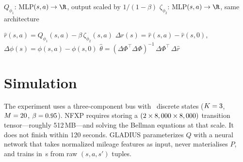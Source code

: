\documentclass[10pt]{article}
\begin{document}
\begin{algorithm}[H]
\DontPrintSemicolon
\caption{GLADIUS (ERM-IRL) \citep{kang2025}}
\label{alg:gladius}
\BlankLine

$Q_{\phi_1}$: MLP$(s, a) \to \R$, output scaled by $1/(1-\beta)$\;
$\zeta_{\phi_2}$: MLP$(s, a) \to \R$, same architecture\;
\BlankLine

\BlankLine

$\hat r(s,a) = Q_{\phi_1}(s,a) - \beta\,\zeta_{\phi_2}(s,a)$\;
$\Delta r(s) = \hat r(s,a) - \hat r(s,0)$, \quad $\Delta\phi(s) = \phi(s,a) - \phi(s,0)$\;
$\hat\theta = (\Delta\Phi^\top\Delta\Phi)^{-1}\,\Delta\Phi^\top\,\Delta \hat r$ 
\BlankLine

\end{algorithm}


\section{Simulation}



The experiment uses a three-component bus with \gladNstates\ discrete states ($K=3$, $M=20$, $\beta = 0.95$). NFXP requires storing a $(2 \times 8,000 \times 8,000)$ transition tensor---roughly 512\,MB---and solving the Bellman equations at that scale. It does not finish within 120 seconds. GLADIUS parameterizes $Q$ with a neural network that takes normalized mileage features as input, never materialises $P$, and trains in \gladTime\,s from raw $(s,a,s')$ tuples.
\end{document}
